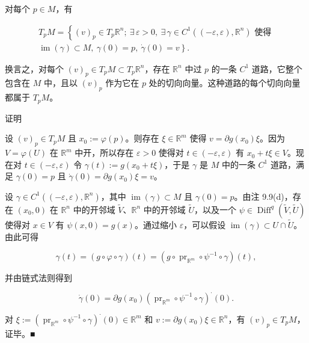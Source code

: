 \begin{theorem}

对每个 $ p \in M $，有

\begin{equation*}
\begin{aligned}
T_{p}M = \left\{ (v)_{p} \in T_{p}\mathbb{R}^{n} ;\ \exists\,\varepsilon > 0,\ \exists\,\gamma \in C^{1}\left((-\varepsilon,\varepsilon),\mathbb{R}^{n}\right) \text{ 使得 } \right. \\ \left. \operatorname{im}(\gamma) \subset M,\ \gamma(0) = p,\ \dot{\gamma}(0) = v \right\} .
\end{aligned}
\end{equation*}

换言之，对每个 $ (v)_{p} \in T_{p}M \subset T_{p}\mathbb{R}^{n} $，存在 $ \mathbb{R}^{n} $ 中过 $ p $ 的一条 $ C^{1} $ 道路，它整个包含在 $ M $ 中，且以 $ (v)_{p} $ 作为它在 $ p $ 处的切向向量。这种道路的每个切向向量都属于 $ T_{p}M $。

证明

\begin{subitems}
\item

设 $ (v)_{p} \in T_{p}M $ 且 $ x_{0} := \varphi(p) $。则存在 $ \xi \in \mathbb{R}^{m} $ 使得 $ v = \partial g(x_{0})\xi $。因为 $ V = \varphi(U) $ 在 $ \mathbb{R}^{m} $ 中开，所以存在 $ \varepsilon > 0 $ 使得对 $ t \in (-\varepsilon,\varepsilon) $ 有 $ x_{0} + t\xi \in V $。现在对 $ t \in (-\varepsilon,\varepsilon) $ 令 $ \gamma(t) := g(x_{0} + t\xi) $，于是 $ \gamma $ 是 $ M $ 中的一条 $ C^{1} $ 道路，满足 $ \gamma(0) = p $ 且 $ \dot{\gamma}(0) = \partial g(x_{0})\xi = v $。

\item

设 $ \gamma \in C^{1}\left((-\varepsilon,\varepsilon),\mathbb{R}^{n}\right) $，其中 $ \operatorname{im}(\gamma) \subset M $ 且 $ \gamma(0) = p $。由注 9.9(d)，存在 $ (x_{0},0) $ 在 $ \mathbb{R}^{n} $ 中的开邻域 $ \tilde{V} $、$ \mathbb{R}^{n} $ 中的开邻域 $ \tilde{U} $，以及一个 $ \psi \in \operatorname{Diff}^{q}(\tilde{V},\tilde{U}) $ 使得对 $ x \in V $ 有 $ \psi(x,0) = g(x) $。通过缩小 $ \varepsilon $，可以假设 $ \operatorname{im}(\gamma) \subset U\cap\tilde{U} $。由此可得

\[
\gamma(t) = (g\circ\varphi\circ\gamma)(t) = (g\circ\operatorname{pr}_{\mathbb{R}^{m}}\circ\psi^{-1}\circ\gamma)(t) ,
\]

并由链式法则得到

\[
\dot{\gamma}(0) = \partial g(x_{0})\left(\operatorname{pr}_{\mathbb{R}^{m}}\circ\psi^{-1}\circ\gamma\right)^{\cdot}(0) .
\]

对 $ \xi := \left(\operatorname{pr}_{\mathbb{R}^{m}}\circ\psi^{-1}\circ\gamma\right)^{\cdot}(0) \in \mathbb{R}^{m} $ 和 $ v := \partial g(x_{0})\xi \in \mathbb{R}^{n} $，有 $ (v)_{p} \in T_{p}M $，证毕。\nobreak\hspace{0.35em}■

\end{subitems}

\end{theorem}

